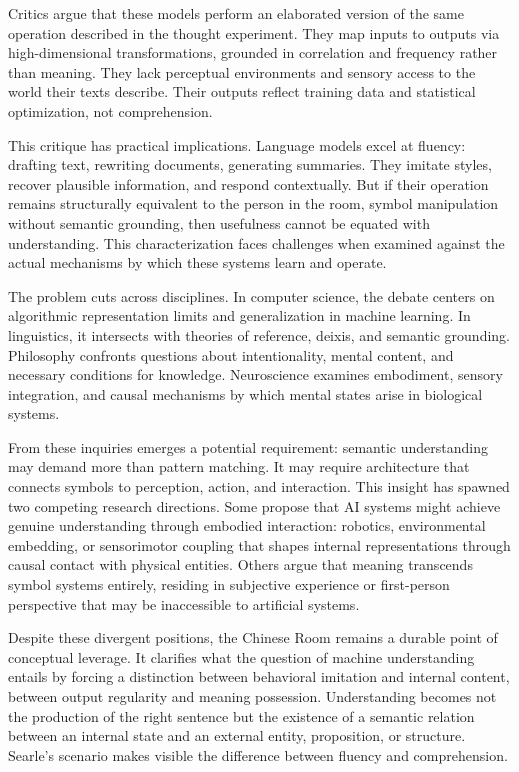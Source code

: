 Critics argue that these models perform an elaborated version of the same operation described in the thought experiment. They map inputs to outputs via high-dimensional transformations, grounded in correlation and frequency rather than meaning. They lack perceptual environments and sensory access to the world their texts describe. Their outputs reflect training data and statistical optimization, not comprehension.

This critique has practical implications. Language models excel at fluency: drafting text, rewriting documents, generating summaries. They imitate styles, recover plausible information, and respond contextually. But if their operation remains structurally equivalent to the person in the room, symbol manipulation without semantic grounding, then usefulness cannot be equated with understanding. This characterization faces challenges when examined against the actual mechanisms by which these systems learn and operate.

The problem cuts across disciplines. In computer science, the debate centers on algorithmic representation limits and generalization in machine learning. In linguistics, it intersects with theories of reference, deixis, and semantic grounding. Philosophy confronts questions about intentionality, mental content, and necessary conditions for knowledge. Neuroscience examines embodiment, sensory integration, and causal mechanisms by which mental states arise in biological systems.

From these inquiries emerges a potential requirement: semantic understanding may demand more than pattern matching. It may require architecture that connects symbols to perception, action, and interaction. This insight has spawned two competing research directions. Some propose that AI systems might achieve genuine understanding through embodied interaction: robotics, environmental embedding, or sensorimotor coupling that shapes internal representations through causal contact with physical entities. Others argue that meaning transcends symbol systems entirely, residing in subjective experience or first-person perspective that may be inaccessible to artificial systems.

Despite these divergent positions, the Chinese Room remains a durable point of conceptual leverage. It clarifies what the question of machine understanding entails by forcing a distinction between behavioral imitation and internal content, between output regularity and meaning possession. Understanding becomes not the production of the right sentence but the existence of a semantic relation between an internal state and an external entity, proposition, or structure. Searle's scenario makes visible the difference between fluency and comprehension.

